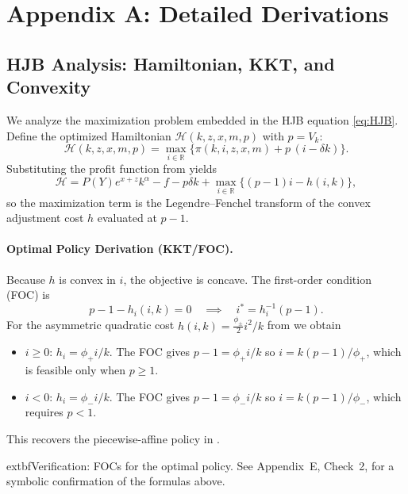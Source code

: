 \documentclass[11pt,letterpaper,oneside]{article}
\newcommand{\R}{\mathbb{R}}
\begin{document}
\appendix
\section{Appendix A: Detailed Derivations}\label{app:derivations}

\subsection{HJB Analysis: Hamiltonian, KKT, and Convexity}\label{app:hjb_analysis}

We analyze the maximization problem embedded in the HJB equation \eqref{eq:HJB}. Define the optimized Hamiltonian $\mathcal{H}(k,z,x,m,p)$ with $p=V_k$:
\begin{equation}\label{eq:hamiltonian}
\mathcal{H}(k,z,x,m,p) = \max_{i\in\R} \Big\{ \pi(k,i,z,x,m) + p\,(i-\delta k) \Big\}.
\end{equation}
Substituting the profit function from  yields
\[
\mathcal{H} = P(Y)e^{x+z}k^\alpha - f - p\delta k + \max_{i\in\R} \Big\{ (p-1)i - h(i,k) \Big\},
\]
so the maximization term is the Legendre--Fenchel transform of the convex adjustment cost $h$ evaluated at $p-1$.

\paragraph{Optimal Policy Derivation (KKT/FOC).}
Because $h$ is convex in $i$, the objective is concave. The first-order condition (FOC) is
\[
 p-1 - h_i(i,k) = 0 \quad \implies \quad i^* = h_i^{-1}(p-1).
\]
For the asymmetric quadratic cost $h(i,k) = \tfrac{\phi_{\pm}}{2}i^2/k$ from  we obtain
\begin{itemize}[leftmargin=1.25em]
    \item $i \ge 0$: $h_i = \phi_+ i/k$. The FOC gives $p-1 = \phi_+ i/k$ so $i = k(p-1)/\phi_+$, which is feasible only when $p \ge 1$.
    \item $i<0$: $h_i = \phi_- i/k$. The FOC gives $p-1 = \phi_- i/k$ so $i = k(p-1)/\phi_-$, which requires $p<1$.
\end{itemize}
This recovers the piecewise-affine policy in .

\begin{tcolorbox}[sympycheckstyle]
    extbf{Verification: FOCs for the optimal policy.} See Appendix~E, Check~2, for a symbolic confirmation of the formulas above.
\end{tcolorbox}
\end{document}

